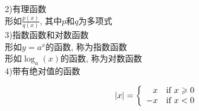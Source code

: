 2)有理函数\\
形如$\displaystyle\frac{p(x)}{q(x)}$, 其中$p$和$q$为多项式\\

3)指数函数和对数函数\\
形如$y=a^x$的函数, 称为指数函数\\[1ex]
形如$\log_a(x)$的函数, 称为对数函数\\

4)带有绝对值的函数\\
\begin{center}
\begin{boxedminipage}{5cm}
\[|x|=\left\{
	\begin{array}{r l}
			x & \text{if}\ x\geqslant0\\
			-x & \text{if}\ x<0
	\end{array}
\right.\]
\end{boxedminipage}
\end{center}

